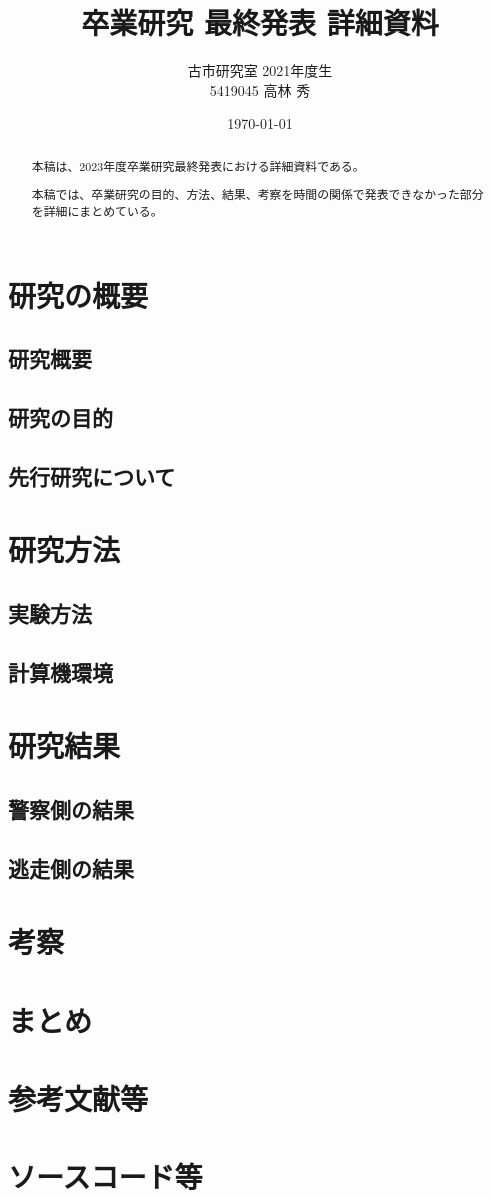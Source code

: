 \documentclass[dvipdfmx]{jsarticle}
\title{卒業研究 最終発表 詳細資料}
\author{古市研究室 2021年度生\\5419045 高林 秀}
\date{\today}
\begin{document}
\maketitle

\begin{abstract}
    本稿は、2023年度卒業研究最終発表における詳細資料である。\par
    本稿では、卒業研究の目的、方法、結果、考察を時間の関係で発表できなかった部分を詳細にまとめている。
\end{abstract}
\tableofcontents

\section{研究の概要}
    \subsection{研究概要}
    \subsection{研究の目的}
    \subsection{先行研究について}
\section{研究方法}
    \subsection{実験方法}
    \subsection{計算機環境}
\section{研究結果}
    \subsection{警察側の結果}
    \subsection{逃走側の結果}
\section{考察}
\section{まとめ}
\section{参考文献等}
\section{ソースコード等}
\end{document}
